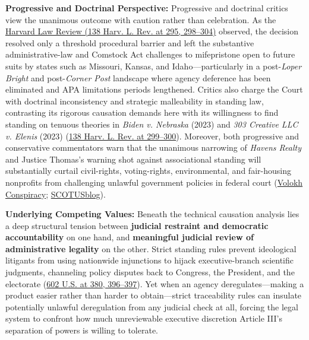 \documentclass[12pt]{article}
\begin{document}
\textbf{Progressive and Doctrinal Perspective:} Progressive and doctrinal critics view the unanimous outcome with caution rather than celebration. As the \href{https://harvardlawreview.org/print/vol-138/fda-v-alliance-for-hippocratic-medicine/}{Harvard Law Review (138 Harv. L. Rev. at 295, 298--304)} observed, the decision resolved only a threshold procedural barrier and left the substantive administrative-law and Comstock Act challenges to mifepristone open to future suits by states such as Missouri, Kansas, and Idaho---particularly in a post-\textit{Loper Bright} and post-\textit{Corner Post} landscape where agency deference has been eliminated and APA limitations periods lengthened. Critics also charge the Court with doctrinal inconsistency and strategic malleability in standing law, contrasting its rigorous causation demands here with its willingness to find standing on tenuous theories in \textit{Biden v. Nebraska} (2023) and \textit{303 Creative LLC v. Elenis} (2023) (\href{https://harvardlawreview.org/print/vol-138/fda-v-alliance-for-hippocratic-medicine/}{138 Harv. L. Rev. at 299--300}). Moreover, both progressive and conservative commentators warn that the unanimous narrowing of \textit{Havens Realty} and Justice Thomas's warning shot against associational standing will substantially curtail civil-rights, voting-rights, environmental, and fair-housing nonprofits from challenging unlawful government policies in federal court (\href{https://reason.com/volokh/2024/06/13/the-standing-analysis-in-fda-v-alliance-for-hippocratic-medicine/}{Volokh Conspiracy}; \href{https://www.scotusblog.com/2024/06/supreme-court-preserves-access-to-abortion-pill/}{SCOTUSblog}).

\textbf{Underlying Competing Values:} Beneath the technical causation analysis lies a deep structural tension between \textbf{judicial restraint and democratic accountability} on one hand, and \textbf{meaningful judicial review of administrative legality} on the other. Strict standing rules prevent ideological litigants from using nationwide injunctions to hijack executive-branch scientific judgments, channeling policy disputes back to Congress, the President, and the electorate (\href{https://www.supremecourt.gov/opinions/23pdf/602us1r35_bqmd.pdf}{602 U.S. at 380, 396--397}). Yet when an agency deregulates---making a product easier rather than harder to obtain---strict traceability rules can insulate potentially unlawful deregulation from any judicial check at all, forcing the legal system to confront how much unreviewable executive discretion Article III's separation of powers is willing to tolerate.
\end{document}
